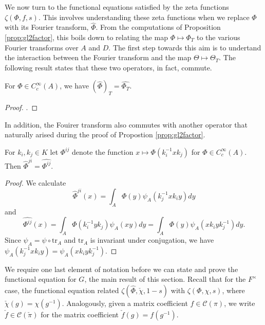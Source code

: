 We now turn to the functional equations satisfied by the zeta functions $\zeta(\Phi,f,s)$. This involves understanding these zeta functions when we replace $\Phi$ with its Fourier transform, $\hat{\Phi}$. From the computations of Proposition \ref{prop:gl2factor}, this boils down to relating the map $\Phi \mapsto \Phi_T$ to the various Fourier transforms over $A$ and $D$. The first step towards this aim is to undertand the interaction between the Fourier transform and the map $\Theta\mapsto\Theta_T$. The following result states that these two operators, in fact, commute.

\begin{lemma}
    For $\Phi \in C_c^\infty(A)$, we have $(\hat{\Phi})_T = \widehat{\Phi_T}$.
\end{lemma}
\begin{proof}
    \cite[Lemma 26.3]{BH1}.
\end{proof}

In addition, the Fouirer transform also commutes with another operator that naturally arised during the proof of Propostion \ref{prop:gl2factor}.

\begin{lemma}\label{hat}
    For $k_i,k_j \in K$ let $\Phi^{ij}$ denote the function $x \mapsto \Phi(k_i^{-1}xk_j)$ for $\Phi \in C_c^\infty(A)$. Then $\hat\Phi^{ji} = \widehat{\Phi^{ij}}$. 
\end{lemma}
\begin{proof}
    We calculate 
    $$\hat\Phi^{ji}(x) = \int_A \Phi(y)\psi_A(k_j^{-1}xk_iy)dy$$
    and 
    $$\widehat{\Phi^{ij}}(x) = \int_A\Phi(k_i^{-1}yk_j)\psi_A(xy)dy = \int_A \Phi(y)\psi_A(xk_iyk_j^{-1})dy.$$
    Since $\psi_A = \psi \circ \mathrm{tr}_A$ and $\mathrm{tr}_A$ is invariant under conjugation, we have $\psi_A(k_j^{-1}xk_iy) = \psi_A(xk_iyk_j^{-1})$.
\end{proof}

We require one last element of notation before we can state and prove the functional equation for $G$, the main result of this section. Recall that for the $F^\times$ case, the functional equation related $\zeta(\hat{\Phi},\check{\chi},1-s)$ with $\zeta(\Phi,\chi,s)$, where $\check{\chi}(g)=\chi(g^{-1})$. Analogously, given a matrix coefficient $f\in\mathcal{C}(\pi)$, we write $\check{f} \in \mathcal C(\check\pi)$ for the matrix coefficient $\check{f}(g) = f(g^{-1})$.

